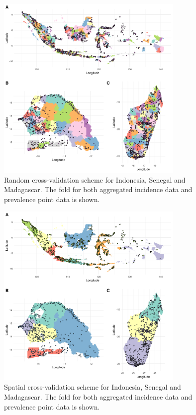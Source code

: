 \documentclass[10pt,a4]{article}
\begin{document}
\begin{figure}[h!]

\centering

\includegraphics[width = 0.8\textwidth]{figures/random_crossvalidation_full.png} 

\caption{Random cross-validation scheme for Indonesia, Senegal and Madagascar. The fold for both aggregated incidence data and prevalence point data is shown.}
\label{fig:cv_random}
\end{figure}


\begin{figure}[h!]
\centering

\includegraphics[width = 0.8\textwidth]{figures/spatial_crossvalidation_full.png}

\caption{ Spatial cross-validation scheme for Indonesia, Senegal and Madagascar. The fold for both aggregated incidence data and prevalence point data is shown.}
\label{fig:cv_spatial}
\end{figure}
\end{document}
